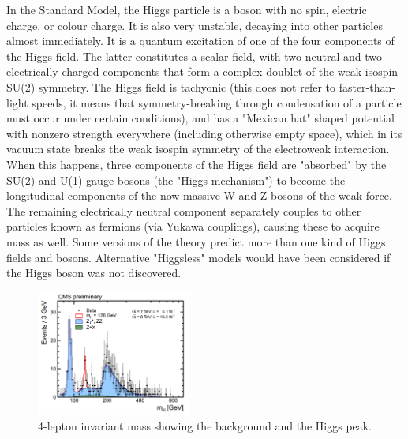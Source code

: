 \documentclass[twocolumn]{revtex4}
\begin{document}
In the Standard Model, the Higgs particle is a boson with no spin, electric charge, or colour charge. It is also very unstable, decaying into other particles almost immediately. It is a quantum excitation of one of the four components of the Higgs field. The latter constitutes a scalar field, with two neutral and two electrically charged components that form a complex doublet of the weak isospin SU(2) symmetry. The Higgs field is tachyonic (this does not refer to faster-than-light speeds, it means that symmetry-breaking through condensation of a particle must occur under certain conditions), and has a "Mexican hat" shaped potential with nonzero strength everywhere (including otherwise empty space), which in its vacuum state breaks the weak isospin symmetry of the electroweak interaction. When this happens, three components of the Higgs field are "absorbed" by the SU(2) and U(1) gauge bosons (the "Higgs mechanism") to become the longitudinal components of the now-massive W and Z bosons of the weak force. The remaining electrically neutral component separately couples to other particles known as fermions (via Yukawa couplings), causing these to acquire mass as well. Some versions of the theory predict more than one kind of Higgs fields and bosons. Alternative "Higgsless" models would have been considered if the Higgs boson was not discovered.

\begin{figure}
    \includegraphics[width=0.45\textwidth]{cms_higgs.png}
    \caption{4-lepton invariant mass showing the background and the Higgs peak.}
\end{figure}



\end{document}
